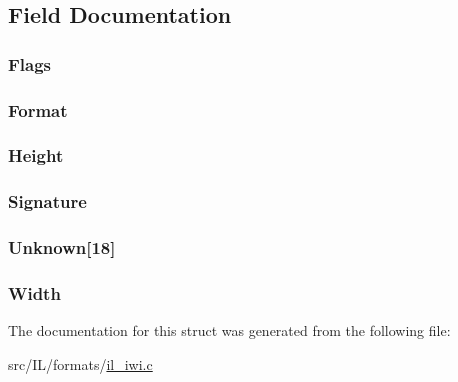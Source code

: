 \subsection{Field Documentation}
\hypertarget{struct_i_w_i_h_e_a_d_a4d4e57f611ec63d5199ee6ea1c56077e}{
\subsubsection[{Flags}]{ Flags}}\label{struct_i_w_i_h_e_a_d_a4d4e57f611ec63d5199ee6ea1c56077e}
\hypertarget{struct_i_w_i_h_e_a_d_aa93a325ca30831f723f4a537174fc6e5}{
\subsubsection[{Format}]{ Format}}\label{struct_i_w_i_h_e_a_d_aa93a325ca30831f723f4a537174fc6e5}
\hypertarget{struct_i_w_i_h_e_a_d_ab74e2bb7cc7272180be796817440ae4e}{
\subsubsection[{Height}]{ Height}}\label{struct_i_w_i_h_e_a_d_ab74e2bb7cc7272180be796817440ae4e}
\hypertarget{struct_i_w_i_h_e_a_d_a41fa9091b239c168dd116f1c2cd99256}{
\subsubsection[{Signature}]{ Signature}}\label{struct_i_w_i_h_e_a_d_a41fa9091b239c168dd116f1c2cd99256}
\hypertarget{struct_i_w_i_h_e_a_d_afacd5863b8a527624c9b80812c1538aa}{
\subsubsection[{Unknown}]{ Unknown\mbox{[}18\mbox{]}}}\label{struct_i_w_i_h_e_a_d_afacd5863b8a527624c9b80812c1538aa}
\hypertarget{struct_i_w_i_h_e_a_d_aed0f0a923b8346ba51a4de45fff77ee7}{
\subsubsection[{Width}]{ Width}}\label{struct_i_w_i_h_e_a_d_aed0f0a923b8346ba51a4de45fff77ee7}


The documentation for this struct was generated from the following file\-:\begin{DoxyCompactItemize}
\item 
src/\-I\-L/formats/\hyperlink{il__iwi_8c}{il\-\_\-iwi.\-c}\end{DoxyCompactItemize}
